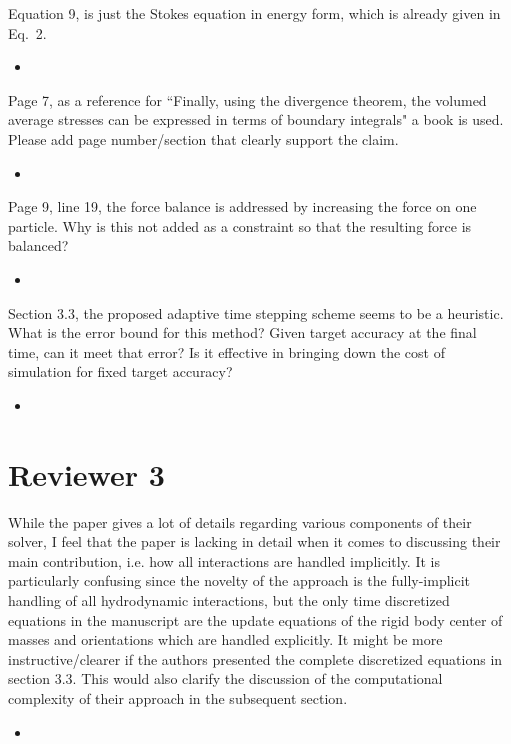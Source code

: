 \documentclass[11pt]{article}
\newcommand{\comment}[1]{{\color{blue} #1}}
\begin{document}
\noindent
\comment{Equation 9, is just the Stokes equation in energy form, which
is already given in Eq.~2.}
\begin{itemize}
  \item
\end{itemize}

\noindent
\comment{Page 7, as a reference for ``Finally, using the divergence
theorem, the volumed average stresses can be expressed in terms of
boundary integrals" a book is used.  Please add page number/section that
clearly support the claim.}
\begin{itemize}
  \item
\end{itemize}

\noindent
\comment{Page 9, line 19, the force balance is addressed by increasing
the force on one particle.  Why is this not added as a constraint so
that the resulting force is balanced?}
\begin{itemize}
  \item
\end{itemize}

\noindent
\comment{Section 3.3, the proposed adaptive time stepping scheme seems
  to be a heuristic.  What is the error bound for this method?  Given
  target accuracy at the final time, can it meet that error?  Is it
  effective in bringing down the cost of simulation for fixed target
accuracy?}
\begin{itemize}
  \item
\end{itemize}



\section*{Reviewer 3}
\noindent
\comment{While the paper gives a lot of details regarding various
  components of their solver, I feel that the paper is lacking in detail
  when it comes to discussing their main contribution, i.e. how all
  interactions are handled implicitly. It is particularly confusing
  since the novelty of the approach is the fully-implicit handling of
  all hydrodynamic interactions, but the only time discretized equations
  in the manuscript are the update equations of the rigid body center of
  masses and orientations which are handled explicitly. It might be more
  instructive/clearer if the authors presented the complete discretized
  equations in section 3.3. This would also clarify the discussion of
the computational complexity of their approach in the subsequent
section.}
\begin{itemize}
  \item
\end{itemize}
\end{document}
